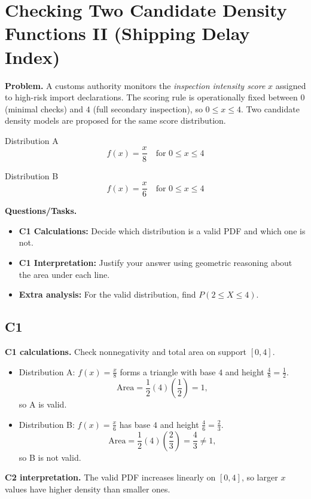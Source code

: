 	\section{Checking Two Candidate Density Functions II (Shipping Delay Index)}
	
	\textbf{Problem.}
	A customs authority monitors the \emph{inspection intensity score} $x$ assigned to high-risk import declarations. The scoring rule is operationally fixed between $0$ (minimal checks) and $4$ (full secondary inspection), so $0\le x\le 4$.
	Two candidate density models are proposed for the same score distribution.
	
	Distribution A
	\[
	f(x)=\frac{x}{8}\quad\text{for }0\le x\le 4
	\]
	
	Distribution B
	\[
	f(x)=\frac{x}{6}\quad\text{for }0\le x\le 4
	\]
	
	\textbf{Questions/Tasks.}
	\begin{itemize}
		\item \textbf{C1 Calculations:} Decide which distribution is a valid PDF and which one is not.
		\item \textbf{C1 Interpretation:} Justify your answer using geometric reasoning about the area under each line.
		\item \textbf{Extra analysis:} For the valid distribution, find $P(2\le X\le 4)$.
	\end{itemize}

	\subsection*{C1}

\textbf{C1 calculations.}
Check nonnegativity and total area on support $[0,4]$.
\begin{itemize}
	\item Distribution A: $f(x)=\frac{x}{8}$ forms a triangle with base $4$ and height $\frac{4}{8}=\frac12$.
	\[
	\text{Area}=\frac12(4)\left(\frac12\right)=1,
	\]
	so A is valid.
	\item Distribution B: $f(x)=\frac{x}{6}$ has base $4$ and height $\frac{4}{6}=\frac23$.
	\[
	\text{Area}=\frac12(4)\left(\frac23\right)=\frac43\ne1,
	\]
	so B is not valid.
\end{itemize}

\textbf{C2 interpretation.}
The valid PDF increases linearly on $[0,4]$, so larger $x$ values have higher density than smaller ones.

